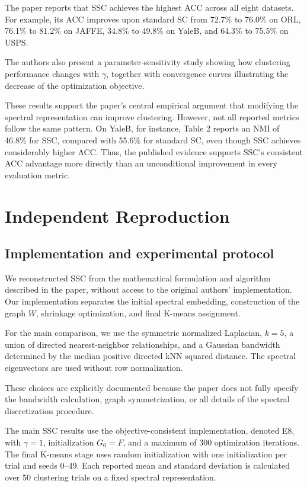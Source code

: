 \documentclass{article}
\begin{document}
The paper reports that SSC achieves the highest ACC across all eight datasets. For example, its ACC improves upon standard SC from 72.7\% to 76.0\% on ORL, 76.1\% to 81.2\% on JAFFE, 34.8\% to 49.8\% on YaleB, and 64.3\% to 75.5\% on USPS.

The authors also present a parameter-sensitivity study showing how clustering performance changes with \(\gamma\), together with convergence curves illustrating the decrease of the optimization objective.

These results support the paper's central empirical argument that modifying the spectral representation can improve clustering. However, not all reported metrics follow the same pattern. On YaleB, for instance, Table 2 reports an NMI of 46.8\% for SSC, compared with 55.6\% for standard SC, even though SSC achieves considerably higher ACC. Thus, the published evidence supports SSC's consistent ACC advantage more directly than an unconditional improvement in every evaluation metric.

\section{Independent Reproduction}

\subsection{Implementation and experimental protocol}

We reconstructed SSC from the mathematical formulation and algorithm described in the paper, without access to the original authors' implementation. Our implementation separates the initial spectral embedding, construction of the graph \(W\), shrinkage optimization, and final K-means assignment.

For the main comparison, we use the symmetric normalized Laplacian, \(k=5\), a union of directed nearest-neighbor relationships, and a Gaussian bandwidth determined by the median positive directed kNN squared distance. The spectral eigenvectors are used without row normalization.

These choices are explicitly documented because the paper does not fully specify the bandwidth calculation, graph symmetrization, or all details of the spectral discretization procedure.

The main SSC results use the objective-consistent implementation, denoted E8, with \(\gamma=1\), initialization \(G_0=F\), and a maximum of 300 optimization iterations. The final K-means stage uses random initialization with one initialization per trial and seeds 0--49. Each reported mean and standard deviation is calculated over 50 clustering trials on a fixed spectral representation.
\end{document}
